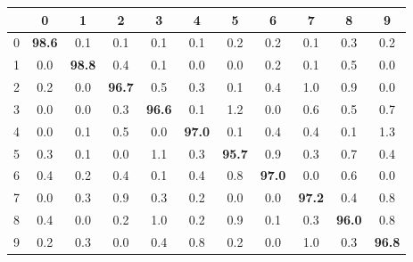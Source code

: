 \documentclass{article}
\begin{document}
\begin{table}[hbt!]
\begin{subtable}{0.5\linewidth}
\begin{tabular}{c| c c c c c c c c c c |}
            & 0 & 1 & 2 & 3 & 4 & 5 & 6 & 7 & 8 & 9 \\ 
          \hline
            0 & \textbf{98.6} & 0.1 & 0.1 & 0.1 & 0.1 & 0.2 & 0.2 & 0.1 & 0.3 & 0.2 \\
            1 & 0.0 & \textbf{98.8} & 0.4 & 0.1 & 0.0 & 0.0 & 0.2 & 0.1 & 0.5 & 0.0 \\
            2 & 0.2 & 0.0 & \textbf{96.7} & 0.5 & 0.3 & 0.1 & 0.4 & 1.0 & 0.9 & 0.0 \\
            3 & 0.0 & 0.0 & 0.3 & \textbf{96.6} & 0.1 & 1.2 & 0.0 & 0.6 & 0.5 & 0.7 \\
            4 & 0.0 & 0.1 & 0.5 & 0.0 & \textbf{97.0} & 0.1 & 0.4 & 0.4 & 0.1 & 1.3 \\
            5 & 0.3 & 0.1 & 0.0 & 1.1 & 0.3 & \textbf{95.7} & 0.9 & 0.3 & 0.7 & 0.4 \\
            6 & 0.4 & 0.2 & 0.4 & 0.1 & 0.4 & 0.8 & \textbf{97.0} & 0.0 & 0.6 & 0.0 \\
            7 & 0.0 & 0.3 & 0.9 & 0.3 & 0.2 & 0.0 & 0.0 & \textbf{97.2} & 0.4 & 0.8 \\
            8 & 0.4 & 0.0 & 0.2 & 1.0 & 0.2 & 0.9 & 0.1 & 0.3 & \textbf{96.0} & 0.8 \\
            9 & 0.2 & 0.3 & 0.0 & 0.4 & 0.8 & 0.2 & 0.0 & 1.0 & 0.3 & \textbf{96.8}
        \end{tabular}
         \label{tab:mnist2}
  \end{subtable}
  \vspace{-3mm}
\end{table}
\end{document}
